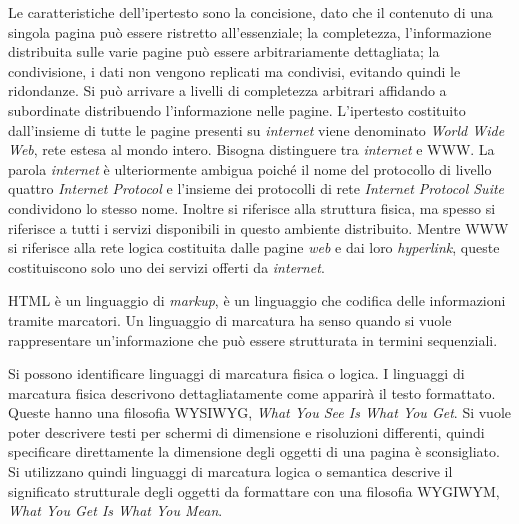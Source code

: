 \documentclass{article}
\numberwithin{equation}{subsection}
\begin{document}
Le caratteristiche dell'ipertesto sono la concisione, dato che il contenuto di una singola pagina può essere ristretto all'essenziale; la completezza, l'informazione distribuita sulle varie pagine può essere arbitrariamente dettagliata; la condivisione, i dati non vengono replicati ma condivisi, evitando quindi le ridondanze. 
Si può arrivare a livelli di completezza arbitrari affidando a subordinate distribuendo l'informazione nelle pagine. 
L'ipertesto costituito dall'insieme di tutte le pagine presenti su \textit{internet} viene denominato \textit{World Wide Web}, rete estesa al mondo intero. 
Bisogna distinguere tra \textit{internet} e WWW. La parola \textit{internet} è ulteriormente ambigua poiché il nome del protocollo di livello quattro \textit{Internet Protocol} e l'insieme dei protocolli di rete \textit{Internet Protocol Suite} condividono lo stesso nome. 
Inoltre si riferisce alla struttura fisica, ma spesso si riferisce a tutti i servizi disponibili in questo ambiente distribuito. 
Mentre WWW si riferisce alla rete logica costituita dalle pagine \textit{web} e dai loro \textit{hyperlink}, queste costituiscono solo uno dei servizi offerti da \textit{internet}. 


\textcolor{Peach}{HTML} è un linguaggio di \textit{markup}, è un linguaggio che codifica delle informazioni tramite marcatori. Un linguaggio di marcatura ha senso quando si vuole rappresentare 
un'informazione che può essere strutturata in termini sequenziali. 

Si possono identificare linguaggi di marcatura fisica o logica. I linguaggi di marcatura fisica descrivono dettagliatamente come apparirà il testo formattato. 
Queste hanno una filosofia WYSIWYG, \textit{What You See Is What You Get}. Si vuole poter descrivere testi per schermi di dimensione e risoluzioni differenti, quindi specificare direttamente la dimensione degli oggetti di una pagina è sconsigliato. Si utilizzano quindi linguaggi di marcatura logica o semantica descrive il significato strutturale degli oggetti da formattare con una filosofia WYGIWYM, \textit{What You Get Is What You Mean}. 
\end{document}
